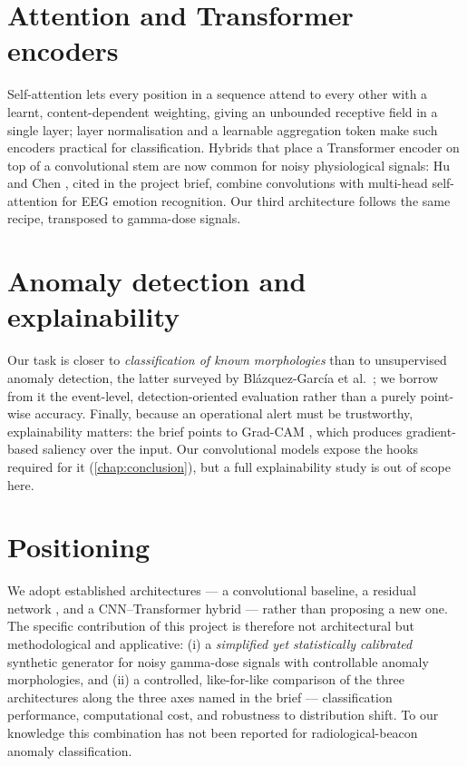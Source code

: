 \section{Attention and Transformer encoders}
\label{sec:rw-attn}

Self-attention \cite{vaswani2017attention} lets every position in a sequence
attend to every other with a learnt, content-dependent weighting, giving an
unbounded receptive field in a single layer; layer normalisation
\cite{ba2016layer} and a learnable aggregation token \cite{devlin2019bert} make
such encoders practical for classification. Hybrids that place a Transformer
encoder on top of a convolutional stem are now common for noisy physiological
signals: Hu and Chen \cite{hu2022eeg}, cited in the project brief, combine
convolutions with multi-head self-attention for EEG emotion recognition. Our
third architecture follows the same recipe, transposed to gamma-dose signals.

\section{Anomaly detection and explainability}
\label{sec:rw-ad}

Our task is closer to \emph{classification of known morphologies} than to
unsupervised anomaly detection, the latter surveyed by Bl\'azquez-Garc\'ia et
al.\ \cite{blazquezgarcia2021review}; we borrow from it the event-level,
detection-oriented evaluation rather than a purely point-wise accuracy. Finally,
because an operational alert must be trustworthy, explainability matters: the
brief points to Grad-CAM \cite{selvaraju2017gradcam}, which produces
gradient-based saliency over the input. Our convolutional models expose the hooks
required for it (\cref{chap:conclusion}), but a full explainability study is out
of scope here.

\section{Positioning}
\label{sec:rw-position}

We adopt established architectures --- a convolutional baseline, a residual
network \cite{he2016deep,wang2017time}, and a CNN--Transformer hybrid
\cite{vaswani2017attention,hu2022eeg} --- rather than proposing a new one. The
specific contribution of this project is therefore not architectural but
methodological and applicative: (i) a \emph{simplified yet statistically
calibrated} synthetic generator for noisy gamma-dose signals with controllable
anomaly morphologies, and (ii) a controlled, like-for-like comparison of the
three architectures along the three axes named in the brief --- classification
performance, computational cost, and robustness to distribution shift. To our
knowledge this combination has not been reported for radiological-beacon anomaly
classification.
